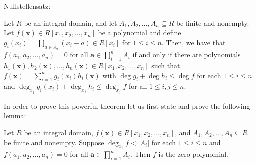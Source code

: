 		Nullstellensatz: \begin{theorem} Let $R$ be an integral domain, and let
			$A_1, A_2, \ldots, A_n \subseteq R$ be finite and
			nonempty. Let $f\left( \textbf{x} \right) \in R[x_1,
			x_2, \ldots, x_{n}]$ be a polynomial and define\\ $g_i
			\left( x_{i} \right) = \prod_{a \in A_i}^{} \left( x_i
			-a \right) \in R[x_{i}] $ for $1 \le i \le n$. Then, we
			have that $f\left( a_1, a_2, \ldots, a_n \right) = 0$
			for all  $ \textbf{a} \in \prod_{i= 1}^{n} A_i $ if and only if
			there are polynomials \\$h_1\left( \textbf{x} \right) ,
			h_2 \left( \textbf{x} \right) , \ldots, h_n \left(
			\textbf{x} \right)  \in R[x_1, x_2, \ldots, x_{n}]$
			such that \\$f\left( \textbf{x} \right) = \sum_{i=
			1}^{n} g_i \left( x_{i} \right) h_i \left( \textbf{x}
		\right) $ with $ \deg g_i + \deg h_i \le \deg f$ for each $1
		\le i \le n$ and $\deg _{x_{j}} g_i \left( x_{i} \right)  +
		\deg _{x_{j}} h_i \le \deg_{x_{j}} f$ for all $1 \le i,j \le
		n$.  \end{theorem} In order to prove this powerful theorem let
		us first state and prove the following lemma: \begin{lemma}[]
			Let $R$ be an integral domain, $f\left( \textbf{x}
			\right) \in R[x_1, x_2, \ldots, x_{n}]$, and $A_1, A_2,
			\ldots, A_n \subseteq R$ be finite and nonempty.
			Suppose $\deg _{x_{i}} f < \left| A_i \right| $ for
			each $1\le i\le n$ and $f\left( a_1, a_2, \ldots, a_n
			\right) = 0$ for all $ \textbf{a} \in \prod_{i= 1}^{n}
			A_i$. Then $f$ is the zero polynomial.  \end{lemma}
